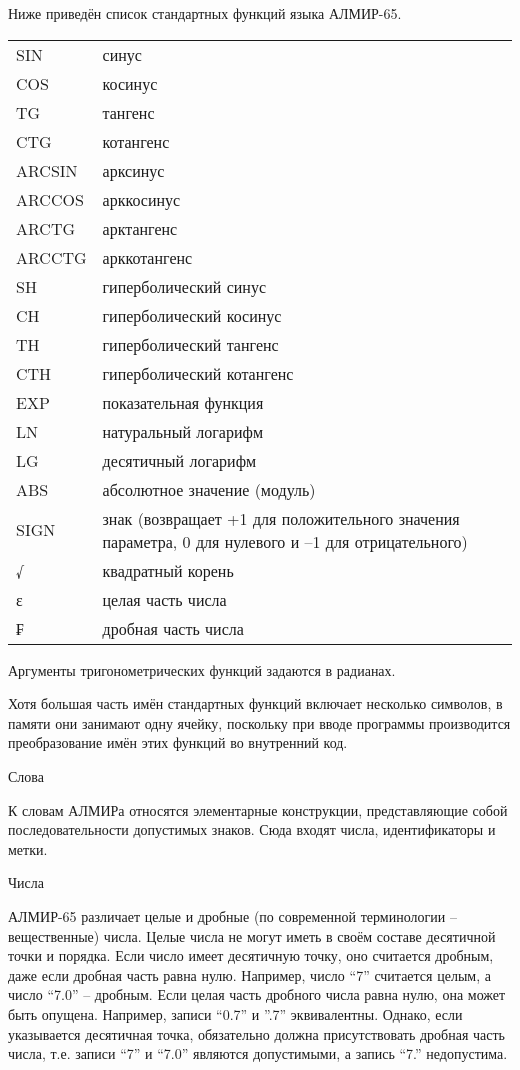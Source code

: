 \documentclass[11pt]{article}
\begin{document}
Ниже приведён список стандартных
функций языка АЛМИР-65.

\begin{tabular}{ll}
  SIN&синус\\
  COS&косинус\\
  TG&тангенс\\
  CTG&котангенс\\
  ARCSIN&арксинус\\
  ARCCOS&арккосинус\\
  ARCTG&арктангенс\\
  ARCCTG&арккотангенс\\
  SH&гиперболический синус\\
  CH&гиперболический косинус\\
  TH&гиперболический тангенс\\
  CTH&гиперболический котангенс\\
  EXP&показательная функция\\
  LN&натуральный логарифм\\
  LG&десятичный логарифм\\
  ABS&абсолютное значение (модуль)\\
  SIGN&знак (возвращает +1 для
  положительного значения параметра, 0
  для нулевого и –1 для отрицательного)\\
  √&квадратный корень\\
  ε&целая часть числа\\
  ₣&дробная часть числа\\
\end{tabular}
Аргументы тригонометрических функций
задаются в радианах.

Хотя большая часть имён стандартных
функций включает несколько символов, в
памяти они занимают одну ячейку,
поскольку при вводе программы
производится преобразование имён этих
функций во внутренний код.

Слова

К словам АЛМИРа относятся элементарные
конструкции, представляющие собой
последовательности допустимых знаков.
Сюда входят числа, идентификаторы и
метки.

Числа

АЛМИР-65 различает целые и дробные (по
современной терминологии –
вещественные) числа. Целые числа не
могут иметь в своём составе десятичной
точки и порядка. Если число имеет
десятичную точку, оно считается
дробным, даже если дробная часть равна
нулю. Например, число “7” считается
целым, а число “7.0” – дробным. Если
целая часть дробного числа равна нулю,
она может быть опущена. Например,
записи “0.7” и ”.7” эквивалентны.
Однако, если указывается десятичная
точка, обязательно должна
присутствовать дробная часть числа,
т.е. записи “7” и “7.0” являются
допустимыми, а запись “7.” недопустима.
\end{document}
